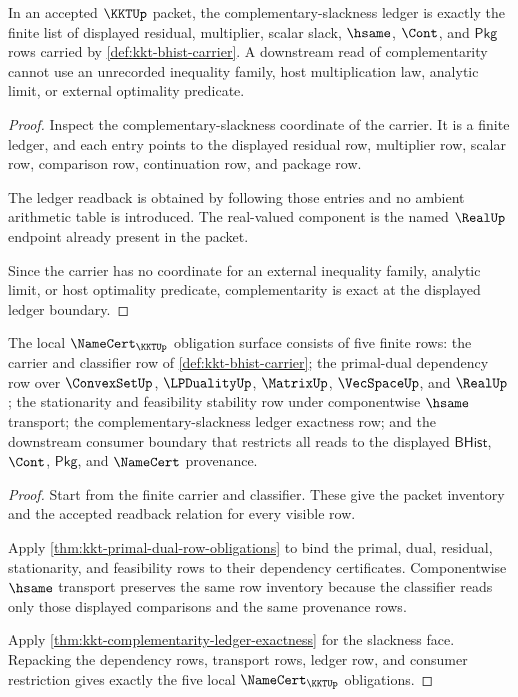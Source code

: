 \begin{theorem}
\label{thm:kkt-complementarity-ledger-exactness}
In an accepted $\KKTUp$ packet, the complementary-slackness ledger is exactly the finite list of displayed residual, multiplier, scalar slack, $\hsame$, $\Cont$, and $\mathsf{Pkg}$ rows carried by \autoref{def:kkt-bhist-carrier}. A downstream read of complementarity cannot use an unrecorded inequality family, host multiplication law, analytic limit, or external optimality predicate.
\end{theorem}
\begin{proof}
Inspect the complementary-slackness coordinate of the carrier. It is a finite ledger, and each entry points to the displayed residual row, multiplier row, scalar row, comparison row, continuation row, and package row.

The ledger readback is obtained by following those entries and no ambient arithmetic table is introduced. The real-valued component is the named $\RealUp$ endpoint already present in the packet.

Since the carrier has no coordinate for an external inequality family, analytic limit, or host optimality predicate, complementarity is exact at the displayed ledger boundary.
\end{proof}

\begin{theorem}
\label{thm:kkt-namecert-obligation-surface}
The local $\NameCert_{\KKTUp}$ obligation surface consists of five finite rows: the carrier and classifier row of \autoref{def:kkt-bhist-carrier}; the primal-dual dependency row over $\ConvexSetUp$, $\LPDualityUp$, $\MatrixUp$, $\VecSpaceUp$, and $\RealUp$; the stationarity and feasibility stability row under componentwise $\hsame$ transport; the complementary-slackness ledger exactness row; and the downstream consumer boundary that restricts all reads to the displayed $\mathsf{BHist}$, $\Cont$, $\mathsf{Pkg}$, and $\NameCert$ provenance.
\end{theorem}
\begin{proof}
Start from the finite carrier and classifier. These give the packet inventory and the accepted readback relation for every visible row.

Apply \autoref{thm:kkt-primal-dual-row-obligations} to bind the primal, dual, residual, stationarity, and feasibility rows to their dependency certificates. Componentwise $\hsame$ transport preserves the same row inventory because the classifier reads only those displayed comparisons and the same provenance rows.

Apply \autoref{thm:kkt-complementarity-ledger-exactness} for the slackness face. Repacking the dependency rows, transport rows, ledger row, and consumer restriction gives exactly the five local $\NameCert_{\KKTUp}$ obligations.
\end{proof}

